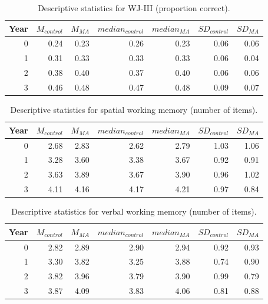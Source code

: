 \documentclass[11pt]{article}
\begin{document}
\begin{table}[H]
\centering
\begin{tabular}{rrrrrrr}
  \hline
Year & $M_{control}$ & $M_{MA}$ & $median_{control}$ & $median_{MA}$ & $SD_{control}$ & $SD_{MA}$ \\
  \hline
  0 & 0.24 & 0.23 & 0.26 & 0.23 & 0.06 & 0.06 \\
    1 & 0.31 & 0.33 & 0.33 & 0.33 & 0.06 & 0.04 \\
    2 & 0.38 & 0.40 & 0.37 & 0.40 & 0.06 & 0.06 \\
    3 & 0.46 & 0.48 & 0.47 & 0.48 & 0.09 & 0.07 \\
   \hline
\end{tabular}
\caption{Descriptive statistics for WJ-III (proportion correct).}
\label{tab:woodcock}
\end{table}
\begin{table}[H]
\centering
\begin{tabular}{rrrrrrr}
  \hline
Year & $M_{control}$ & $M_{MA}$ & $median_{control}$ & $median_{MA}$ & $SD_{control}$ & $SD_{MA}$ \\
  \hline
  0 & 2.68 & 2.83 & 2.62 & 2.79 & 1.03 & 1.06 \\
    1 & 3.28 & 3.60 & 3.38 & 3.67 & 0.92 & 0.91 \\
    2 & 3.63 & 3.89 & 3.67 & 3.90 & 0.96 & 1.02 \\
    3 & 4.11 & 4.16 & 4.17 & 4.21 & 0.97 & 0.84 \\
   \hline
\end{tabular}
\caption{Descriptive statistics for spatial working memory (number of items).}
\label{tab:spatialwm}
\end{table}
\begin{table}[H]
\centering
\begin{tabular}{rrrrrrr}
  \hline
Year & $M_{control}$ & $M_{MA}$ & $median_{control}$ & $median_{MA}$ & $SD_{control}$ & $SD_{MA}$ \\
  \hline
  0 & 2.82 & 2.89 & 2.90 & 2.94 & 0.92 & 0.93 \\
    1 & 3.30 & 3.82 & 3.25 & 3.88 & 0.74 & 0.90 \\
    2 & 3.82 & 3.96 & 3.79 & 3.90 & 0.99 & 0.79 \\
    3 & 3.87 & 4.09 & 3.83 & 4.06 & 0.81 & 0.88 \\
   \hline
\end{tabular}
\caption{Descriptive statistics for verbal working memory (number of items).}
\label{tab:verbalwm}
\end{table}
\end{document}
